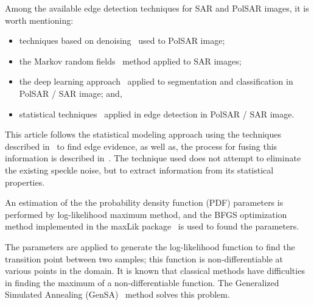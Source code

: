 \documentclass[journal]{IEEEtran}
\begin{document}
Among the available edge detection techniques for SAR and PolSAR images, it is worth mentioning:
\begin{itemize}
\item techniques based on denoising~\cite{sjx, lzly, wxbzw, law, cgaf} used to PolSAR image;   
\item the Markov random fields~\cite{bf} method applied to SAR images;	
\item the deep learning approach~\cite{bac, ztmxzxf} applied to segmentation and classification in PolSAR / SAR image; and,
\item statistical techniques~\cite{gmbf, fbgm, nhfc} applied in edge detection in PolSAR / SAR image.
\end{itemize}
%

This article follows the statistical modeling approach using the techniques described in~\cite{gmbf, fbgm, nhfc} to find edge evidence, as well as, the process for fusing this information is described in~\cite{mit, bmf_2019}. The technique used does not attempt to eliminate the existing speckle noise, but to extract information from its statistical properties.


An estimation of the the probability density function (PDF) parameters is performed by log-likelihood maximum method, and the BFGS optimization method implemented in the maxLik package~\cite{ht} is used to found the parameters.

The parameters are applied to generate the log-likelihood function to find the transition point between two samples; this function is non-differentiable at various points in the domain. It is known that classical methods have difficulties in finding the maximum of a non-differentiable function. The Generalized Simulated Annealing (GenSA)~\cite{xgsh} method solves this problem. 
 
\end{document}
